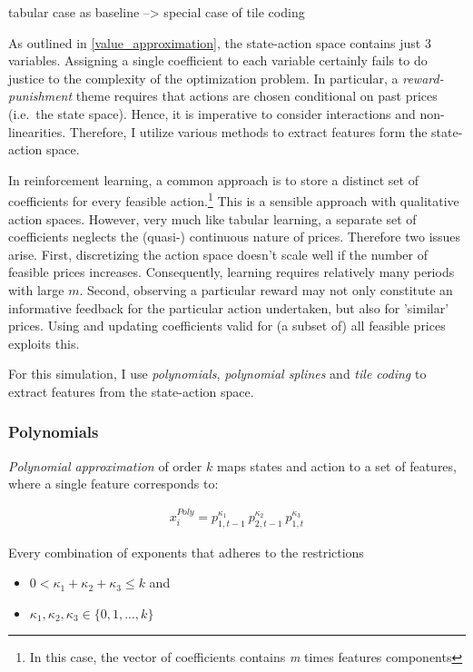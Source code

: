 tabular case as baseline --> special case of tile coding

As outlined in \autoref{value_approximation}, the state-action space contains just 3 variables. Assigning a single coefficient to each variable certainly fails to do justice to the complexity of the optimization problem. In particular, a \emph{reward-punishment} theme requires that actions are chosen conditional on past prices (i.e.\ the state space). Hence, it is imperative to consider interactions and non-linearities. Therefore, I utilize various methods to extract features form the state-action space.

In reinforcement learning, a common approach is to store a distinct set of coefficients for every feasible action.\footnote{In this case, the vector of coefficients contains \emph{m} times features components} This is a sensible approach with qualitative action spaces. However, very much like tabular learning, a separate set of coefficients neglects the (quasi-) continuous nature of prices. Therefore two issues arise. First, discretizing the action space doesn't scale well if the number of feasible prices increases. Consequently, learning requires relatively many periods with large $m$. Second, observing a particular reward may not only constitute an informative feedback for the particular action undertaken, but also for 'similar' prices. Using and updating coefficients valid for (a subset of) all feasible prices exploits this.

For this simulation, I use \emph{polynomials}, \emph{polynomial splines} and \emph{tile coding} to extract features from the state-action space.

\subsubsection{Polynomials}

\emph{Polynomial approximation} of order $k$ maps states and action to a set of features, where a single feature corresponds to:



\begin{gather}
x_i^{Poly} = p_{1, t-1}^{\kappa_1} ~ p_{2, t-1}^{\kappa_2} ~ p_{1, t}^{\kappa_3}
\end{gather}


Every combination of exponents that adheres to the restrictions

\begin{itemize}
	\item $0 < \kappa_1 + \kappa_2 + \kappa_3 \leq k$ and
	\item $\kappa_1, \kappa_2, \kappa_3 \in \{0, 1, ..., k\}$
\end{itemize}

